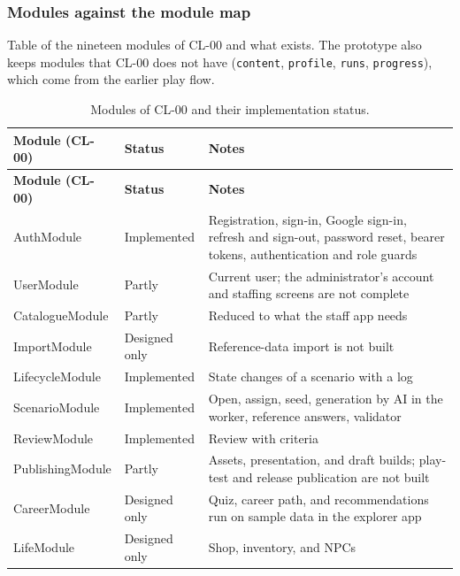 \subsubsection{Modules against the module map}

Table of the nineteen modules of CL-00 and what exists. The prototype also keeps modules that CL-00 does not have (\texttt{content}, \texttt{profile}, \texttt{runs}, \texttt{progress}), which come from the earlier play flow.

{\small{}\renewcommand{\arraystretch}{1.1}
\begin{longtable}{|>{\raggedright\arraybackslash}p{}|>{\raggedright\arraybackslash}p{}|>{\raggedright\arraybackslash}p{}|}
\caption{Modules of CL-00 and their implementation status.} \\
\hline
\textbf{Module (CL-00)} & \textbf{Status} & \textbf{Notes} \\ \hline
\endfirsthead
\hline
\textbf{Module (CL-00)} & \textbf{Status} & \textbf{Notes} \\ \hline
\endhead
AuthModule & Implemented & Registration, sign-in, Google sign-in, refresh and sign-out, password reset, bearer tokens, authentication and role guards \\ \hline
UserModule & Partly & Current user; the administrator's account and staffing screens are not complete \\ \hline
CatalogueModule & Partly & Reduced to what the staff app needs \\ \hline
ImportModule & Designed only & Reference-\allowbreak{}data import is not built \\ \hline
LifecycleModule & Implemented & State changes of a scenario with a log \\ \hline
ScenarioModule & Implemented & Open, assign, seed, generation by AI in the worker, reference answers, validator \\ \hline
ReviewModule & Implemented & Review with criteria \\ \hline
PublishingModule & Partly & Assets, presentation, and draft builds; play-test and release publication are not built \\ \hline
CareerModule & Designed only & Quiz, career path, and recommendations run on sample data in the explorer app \\ \hline
LifeModule & Designed only & Shop, inventory, and NPCs \\ \hline

\end{longtable}}
